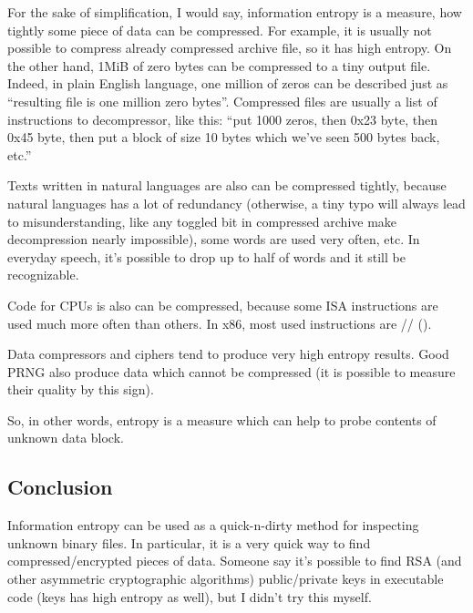 \label{entropy}

For the sake of simplification, I would say, information entropy is a measure,
how tightly some piece of data can be compressed.
For example, it is usually not possible to compress already compressed archive file, so it has high entropy.
On the other hand, 1MiB of zero bytes can be compressed to a tiny output file.
Indeed, in plain English language, one million of zeros can be described just as
``resulting file is one million zero bytes''.
Compressed files are usually a list of instructions to decompressor, like this:
``put 1000 zeros, then 0x23 byte, then 0x45 byte, then put a block of size 10 bytes which we've seen 500 bytes back, etc.''

Texts written in natural languages are also can be compressed tightly, 
because natural languages has a lot of redundancy
(otherwise, a tiny typo will always lead to misunderstanding, 
like any toggled bit in compressed archive make decompression nearly impossible), 
some words are used very often, etc.
In everyday speech, it's possible to drop up to half of words and it still be recognizable.

Code for CPUs is also can be compressed, because some \ac{ISA} instructions are used much more often than others.
In x86, most used instructions are // ().

Data compressors and ciphers tend to produce very high entropy results.
Good \ac{PRNG} also produce data which cannot be compressed 
(it is possible to measure their quality by this sign).

So, in other words, entropy is a measure which can help to probe contents of unknown data block.



\subsection{Conclusion}

Information entropy can be used as a quick-n-dirty method for inspecting unknown binary files.
In particular, it is a very quick way to find compressed/encrypted pieces of data.
Someone say it's possible to find \ac{RSA} (and other asymmetric cryptographic algorithms) public/private keys 
in executable code (keys has high entropy as well), but I didn't try this myself.

